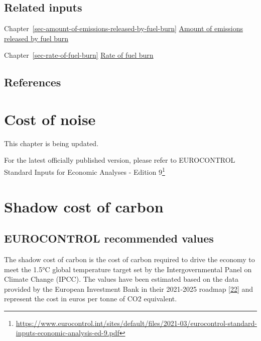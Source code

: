 \documentclass[
  11pt,
  a4paper,
]{book}
\DeclareRobustCommand{\href}[2]{#2\footnote{\url{#1}}}
\begin{document}
\hypertarget{related-inputs-6}{%
\section{Related inputs}\label{related-inputs-6}}

Chapter~\ref{sec-amount-of-emissions-released-by-fuel-burn}
\protect\hyperlink{sec-amount-of-emissions-released-by-fuel-burn}{Amount
of emissions released by fuel burn}

Chapter~\ref{sec-rate-of-fuel-burn}
\protect\hyperlink{ec-rate-of-fuel-burn}{Rate of fuel burn}

\hypertarget{references-7}{%
\section{References}\label{references-7}}

\hypertarget{sec-cost-of-noise}{%
\chapter{Cost of noise}\label{sec-cost-of-noise}}

This chapter is being updated.

For the latest officially published version, please refer to
\href{https://www.eurocontrol.int/sites/default/files/2021-03/eurocontrol-standard-inputs-economic-analysis-ed-9.pdf}{EUROCONTROL
Standard Inputs for Economic Analyses - Edition 9}

\hypertarget{sec-shadow-cost-of-carbon}{%
\chapter{Shadow cost of carbon}\label{sec-shadow-cost-of-carbon}}

\hypertarget{eurocontrol-recommended-values-5}{%
\section{EUROCONTROL recommended
values}\label{eurocontrol-recommended-values-5}}

The shadow cost of carbon is the cost of carbon required to drive the
economy to meet the 1.5°C global temperature target set by the
Intergovernmental Panel on Climate Change (IPCC). The values have been
estimated based on the data provided by the European Investment Bank in
their 2021-2025 roadmap \protect\hyperlink{ref-eib2020}{{[}22{]}} and
represent the cost in euros per tonne of CO2 equivalent.
\end{document}
